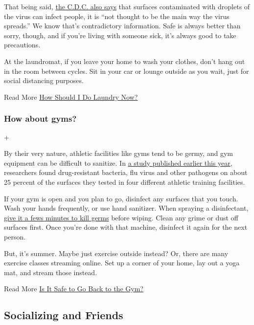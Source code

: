 That being said,
\href{https://www.nytimes.com/2020/05/22/health/cdc-coronavirus-touching-surfaces.html}{the
C.D.C. also says} that surfaces contaminated with droplets of the virus
can infect people, it is ``not thought to be the main way the virus
spreads.'' We know that's contradictory information. Safe is always
better than sorry, though, and if you're living with someone sick, it's
always good to take precautions.

At the laundromat, if you leave your home to wash your clothes, don't
hang out in the room between cycles. Sit in your car or lounge outside
as you wait, just for social distancing purposes.

 Read More
\href{https://www.nytimes.com/2020/03/26/style/how-to-do-laundry-coronavirus.html}{How
Should I Do Laundry Now?}

\hypertarget{how-about-gyms}{%
\subsubsection{How about gyms?}\label{how-about-gyms}}

+

By their very nature, athletic facilities like gyms tend to be germy,
and gym equipment can be difficult to sanitize. In
\href{https://pubmed.ncbi.nlm.nih.gov/31660785/}{a study published
earlier this year}, researchers found drug-resistant bacteria, flu virus
and other pathogens on about 25 percent of the surfaces they tested in
four different athletic training facilities.

If your gym is open and you plan to go, disinfect any surfaces that you
touch. Wash your hands frequently, or use hand sanitizer. When spraying
a disinfectant,
\href{https://www.nytimes.com/2020/05/06/well/live/coronavirus-cleaning-cleaners-disinfectants-home.html}{give
it a fews minutes to kill germs} before wiping. Clean any grime or dust
off surfaces first. Once you're done with that machine, disinfect it
again for the next person.

But, it's summer. Maybe just exercise outside instead? Or, there are
many exercise classes streaming online. Set up a corner of your home,
lay out a yoga mat, and stream those instead.

 Read More
\href{https://www.nytimes.com/2020/05/13/well/move/coronavirus-gym-safety.html}{Is
It Safe to Go Back to the Gym?}

\hypertarget{socializing-and-friends}{%
\subsection{Socializing and Friends}\label{socializing-and-friends}}

